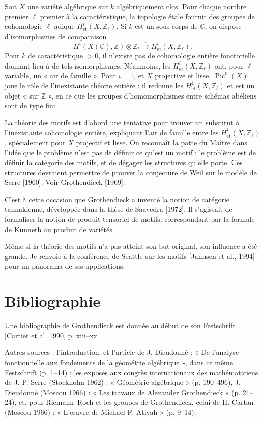 \documentclass[11pt]{article}
\begin{document}
Soit \(X\) une variété algébrique sur \(k\) algébriquement clos. Pour chaque nombre premier \(\ell\) premier à la caractéristique, la topologie étale fournit des groupes de cohomologie \(\ell\)-adique \(H^i_{\mathrm{\acute et}}(X,\mathbb Z_\ell)\). Si \(k\) est un sous-corps de \(\mathbb C\), on dispose d'isomorphismes de comparaison
\[
  H^i(X(\mathbb C),\mathbb Z)\otimes\mathbb Z_\ell
  \xrightarrow{\sim}
  H^i_{\mathrm{\acute et}}(X,\mathbb Z_\ell).
\]
Pour \(k\) de caractéristique \(>0\), il n'existe pas de cohomologie entière fonctorielle donnant lieu à de tels isomorphismes. Néanmoins, les \(H^i_{\mathrm{\acute et}}(X,\mathbb Z_\ell)\) ont, pour \(\ell\) variable, un « air de famille ». Pour \(i=1\), et \(X\) projective et lisse, \(\operatorname{Pic}^0(X)\) joue le rôle de l'inexistante théorie entière : il redonne les \(H^1_{\mathrm{\acute et}}(X,\mathbb Z_\ell)\) et est un objet « sur \(\mathbb Z\) », en ce que les groupes d'homomorphismes entre schémas abéliens sont de type fini.

La théorie des motifs est d'abord une tentative pour trouver un substitut à l'inexistante cohomologie entière, expliquant l'air de famille entre les \(H^i_{\mathrm{\acute et}}(X,\mathbb Z_\ell)\), spécialement pour \(X\) projectif et lisse. On reconnaît la patte du Maître dans l'idée que le problème n'est pas de définir ce qu'est un motif : le problème est de définir la catégorie des motifs, et de dégager les structures qu'elle porte. Ces structures devraient permettre de prouver la conjecture de Weil sur le modèle de Serre [1960]. Voir Grothendieck [1969].

C'est à cette occasion que Grothendieck a inventé la notion de catégorie tannakienne, développée dans la thèse de Saavedra [1972]. Il s'agissait de formaliser la notion de produit tensoriel de motifs, correspondant par la formule de Künneth au produit de variétés.

Même si la théorie des motifs n'a pas atteint son but original, son influence a été grande. Je renvoie à la conférence de Seattle sur les motifs [Jannsen et al., 1994] pour un panorama de ses applications.

\section*{Bibliographie}

Une bibliographie de Grothendieck est donnée au début de son Festschrift [Cartier et al. 1990, p. xiii--xx].

Autres sources : l'introduction, et l'article de J. Dieudonné : « De l'analyse fonctionnelle aux fondements de la géométrie algébrique », dans ce même Festschrift (p. 1--14) ; les exposés aux congrès internationaux des mathématiciens de J.-P. Serre (Stockholm 1962) : « Géométrie algébrique » (p. 190--496), J. Dieudonné (Moscou 1966) : « Les travaux de Alexander Grothendieck » (p. 21--24), et, pour Riemann--Roch et les groupes de Grothendieck, celui de H. Cartan (Moscou 1966) : « L'œuvre de Michael F. Atiyah » (p. 9--14).
\end{document}
